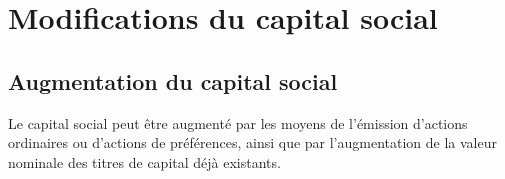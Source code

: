 \documentclass[a4paper,12pt]{report}
\begin{document}
\section{Modifications du capital social}
%
%
%
%
%
\subsection{Augmentation du capital social}


Le capital social peut être augmenté par les moyens de l'émission d'actions ordinaires ou d'actions de préférences, 
ainsi que par l'augmentation de la valeur nominale des titres de capital déjà existants.
\end{document}
